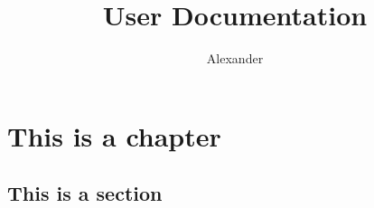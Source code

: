\documentclass{style}
\title{User Documentation}
\author{Alexander}
\begin{document}
\maketitle
\renewcommand{\thepage}{\roman{page}}

\pagestyle{plain}
\newpage \thispagestyle{empty} \vspace*{\fill} \newpage %
\tableofcontents
\cleardoublepage

\pagestyle{normal}
\renewcommand{\thepage}{\arabic{page}}
\setcounter{page}{1}
\chapter{This is a chapter}
\section{This is a section}
\lipsum[1-20]
\end{document}
